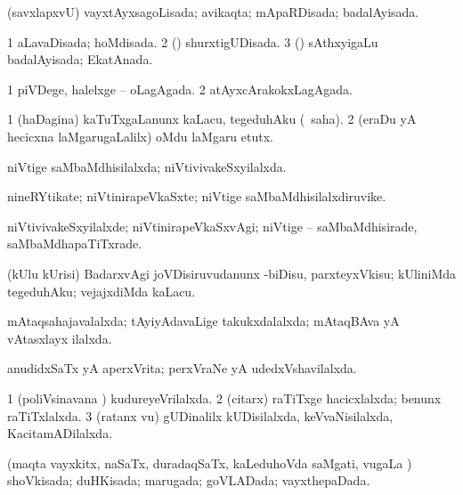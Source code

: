 \bentry
{} 
\gl{\gu}
\expl{}
\bmng
(savxlapxvU) vayxtAyxsagoLisada; avikaqta; mApaRDisada; badalAyisada. 
\emng
\eentry

\bentry
{} 
\gl{\gu}
\expl{}
\bmng
\bnum
\num{1} aLavaDisada; hoMdisada. 
\num{2} (\dhavxni) shurxtigUDisada. 
\num{3} (\saM) sAthxyigaLu badalAyisada; EkatAnada. 
\enum
\emng
\eentry

\bentry
{} 
\gl{\gu}
\expl{}
\bmng
\bnum
\num{1} piVDege, halelxge -- oLagAgada. 
\num{2} atAyxcArakokxLagAgada. 
\enum
\emng
\eentry

\bentry
{} 
\gl{\sakirx}
\expl{}
\bmng
\bnum
\num{1} (haDagina) kaTuTxgaLanunx kaLacu, tegeduhAku (\rUpa\ saha). 
\num{2} (eraDu yA hecicxna laMgarugaLalilx) oMdu laMgaru etutx. 
\enum
\emng
\eentry

\bentry
{} 
\gl{\gu}
\expl{}
\bmng
niVtige saMbaMdhisilalxda; niVtivivakeSxyilalxda. 
\emng
\eentry

\bentry
{} 
\gl{\nA}
\expl{}
\bmng
nineRYtikate; niVtinirapeVkaSxte; niVtige saMbaMdhisilalxdiruvike. 
\emng
\eentry

\bentry
{} 
\gl{\kirxvi}
\expl{}
\bmng
niVtivivakeSxyilalxde; niVtinirapeVkaSxvAgi; niVtige -- saMbaMdhisirade, saMbaMdhapaTiTxrade. 
\emng
\eentry

\bentry
{} 
\gl{\sakirx}
\expl{}
\bmng
(kUlu kUrisi) BadarxvAgi joVDisiruvudanunx -biDisu, parxteyxVkisu; kUliniMda tegeduhAku; vejajxdiMda kaLacu. 
\emng
\eentry

\bentry
{} 
\gl{\gu}
\expl{}
\bmng
mAtaqsahajavalalxda; tAyiyAdavaLige takukxdalalxda; mAtaqBAva yA vAtasxlayx ilalxda. 
\emng
\eentry

\bentry
{} 
\gl{\gu}
\expl{}
\bmng
anudidxSaTx yA aperxVrita; perxVraNe yA udedxVshavilalxda. 
\emng
\eentry

\bentry
{} 
\gl{\gu}
\expl{}
\bmng
\bnum
\num{1} (poliVsinavana \vi) kudureyeVrilalxda. 
\num{2} (citarx) raTiTxge hacicxlalxda; benunx raTiTxlalxda. 
\num{3} (ratanx \mo vu) gUDinalilx kUDisilalxda, keVvaNisilalxda, KacitamADilalxda. 
\enum
\emng
\eentry

\bentry
{} 
\gl{\gu}
\expl{}
\bmng
(maqta vayxkitx, naSaTx, duradaqSaTx, kaLeduhoVda saMgati, \mo vugaLa \vi) shoVkisada; duHKisada; marugada; goVLADada; vayxthepaDada. 
\emng
\eentry

